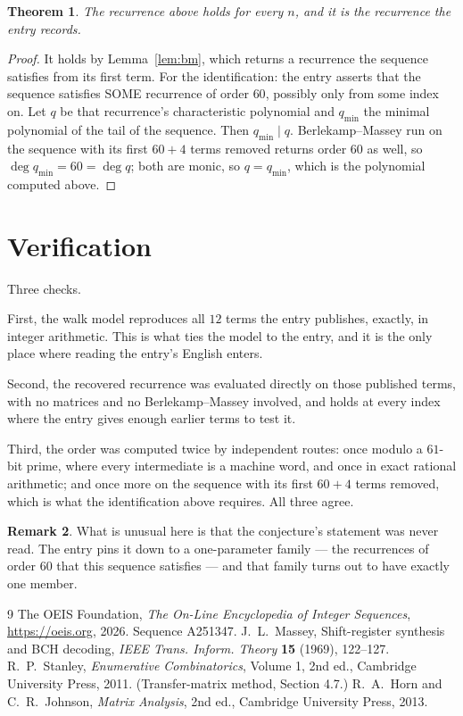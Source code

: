 \documentclass[11pt,a4paper]{article}
\theoremstyle{plain}
\newtheorem{theorem}{Theorem}
\theoremstyle{definition}
\newtheorem{remark}[theorem]{Remark}
\begin{document}
\begin{theorem}
The recurrence above holds for every $n$, and it is the recurrence the entry records.
\end{theorem}

\begin{proof}
It holds by Lemma~\ref{lem:bm}, which returns a recurrence the sequence satisfies from its
first term. For the identification: the entry asserts that the sequence satisfies SOME
recurrence of order $60$, possibly only from some index on. Let $q$ be that recurrence's
characteristic polynomial and $q_{\min}$ the minimal polynomial of the tail of the sequence.
Then $q_{\min}\mid q$. Berlekamp--Massey run on the sequence with its first $60+4$ terms
removed returns order $60$ as well, so $\deg q_{\min}=60=\deg q$; both are monic, so
$q=q_{\min}$, which is the polynomial computed above.
\end{proof}

\section{Verification}

Three checks.

First, the walk model reproduces all $12$ terms the entry publishes, exactly, in integer
arithmetic. This is what ties the model to the entry, and it is the only place where reading
the entry's English enters.

Second, the recovered recurrence was evaluated directly on those published terms, with no
matrices and no Berlekamp--Massey involved, and holds at every index where the entry gives
enough earlier terms to test it.

Third, the order was computed twice by independent routes: once modulo a $61$-bit prime, where
every intermediate is a machine word, and once in exact rational arithmetic; and once more on
the sequence with its first $60+4$ terms removed, which is what the identification above
requires. All three agree.

\begin{remark}
What is unusual here is that the conjecture's statement was never read. The entry pins it down
to a one-parameter family --- the recurrences of order $60$ that this sequence satisfies
--- and that family turns out to have exactly one member.
\end{remark}

\begin{thebibliography}{9}
 The OEIS Foundation, \emph{The On-Line Encyclopedia of Integer
Sequences}, \url{https://oeis.org}, 2026. Sequence A251347.
 J.~L.~Massey, Shift-register synthesis and BCH decoding, \emph{IEEE
Trans. Inform. Theory} \textbf{15} (1969), 122--127.
 R.~P.~Stanley, \emph{Enumerative Combinatorics}, Volume 1, 2nd ed.,
Cambridge University Press, 2011. (Transfer-matrix method, Section 4.7.)
 R.~A.~Horn and C.~R.~Johnson, \emph{Matrix Analysis}, 2nd ed., Cambridge
University Press, 2013.
\end{thebibliography}
\end{document}
